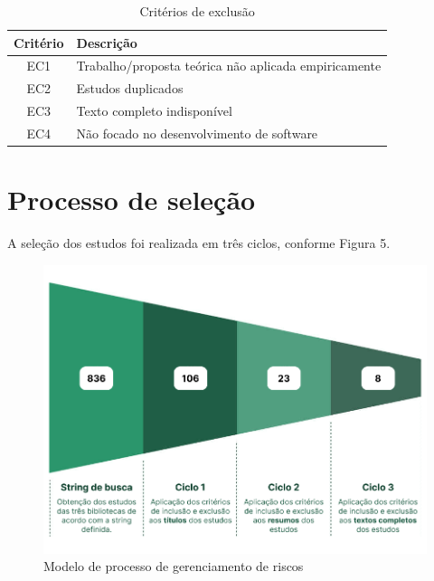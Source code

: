 \documentclass[
	12pt,
	openright,
	twoside,
	a4paper,
	english,
	brazil
	]{abntex2}
\begin{document}
\begin{table}[H]
  \centering
  \caption{Critérios de exclusão}
  \begin{tabular}{|c|l|}
  \hline
  \textbf{Critério} & \textbf{Descrição} \\ \hline
  EC1 & Trabalho/proposta teórica não aplicada empiricamente \\ \hline
  EC2 & Estudos duplicados \\ \hline
  EC3 & Texto completo indisponível \\ \hline
  EC4 & Não focado no desenvolvimento de software \\ \hline
  \end{tabular}
\end{table}


\section{Processo de seleção}

A seleção dos estudos foi realizada em três ciclos, conforme Figura 5.

\begin{figure}[H]
	\caption{\label{numero-estudos-ciclo}Modelo de processo de gerenciamento de riscos}
  \includegraphics[width=\textwidth]{numero-estudos-ciclo}
\end{figure}
\end{document}
